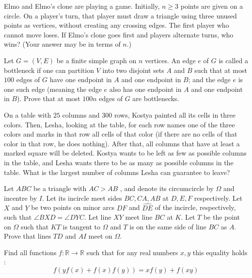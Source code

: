 \documentclass[11pt]{scrartcl}
\begin{document}
\begin{problem}[467943798848835]
Elmo and Elmo's clone are playing a game. Initially, $n\geq 3$ points are given on a circle. On a player's turn, that player must draw a triangle using three unused points as vertices, without creating any crossing edges. The first player who cannot move loses. If Elmo's clone goes first and players alternate turns, who wins? (Your answer may be in terms of $n$.)
\end{problem}
\begin{problem}[472882074231586]
Let $G = (V, E)$ be a finite simple graph on $n$ vertices. An edge $e$ of $G$ is called a bottleneck if one can partition $V$ into two disjoint sets $A$ and $B$ such that
at most $100$ edges of $G$ have one endpoint in $A$ and one endpoint in $B$; and
the edge $e$ is one such edge (meaning the edge $e$ also has one endpoint in $A$ and one endpoint in $B$).
Prove that at most $100n$ edges of $G$ are bottlenecks.
\end{problem}
\begin{problem}[482459214391384]
	On a table with $25$ columns and $300$ rows, Kostya painted all its cells in three colors. Then, Lesha, looking at the table, for each row names one of the three colors and marks in that row all cells of that color (if there are no cells of that color in that row, he does nothing). After that, all columns that have at least a marked square will be deleted.
Kostya wants to be left as few as possible columns in the table, and Lesha wants there to be as many as possible columns in the table. What is the largest number of columns Lesha can guarantee to leave?
\end{problem}
\begin{problem}[487703623613277]
	Let $ABC$ be a triangle with $AC>AB$ , and denote its circumcircle by $\Omega$ and incentre by $I$. Let its incircle meet sides $BC,CA,AB$ at $D,E,F$ respectively. Let $X$ and $Y$ be two points on minor arcs $\widehat{DF}$ and $\widehat{DE}$ of the incircle, respectively, such that $\angle BXD = \angle DYC$. Let line $XY$ meet line $BC$ at $K$. Let $T$ be the point on $\Omega$ such that $KT$ is tangent to $\Omega$ and $T$ is on the same side of line $BC$ as $A$. Prove that lines $TD$ and $AI$ meet on $\Omega$.
\end{problem}
\begin{problem}[492001282661372]
Find all functions $f : \mathbb{R} \to \mathbb{R}$ such that for any real numbers $x , y$ this equality holds :
$$f(yf(x)+f(x)f(y))=xf(y)+f(xy)$$
\end{problem}
\end{document}
